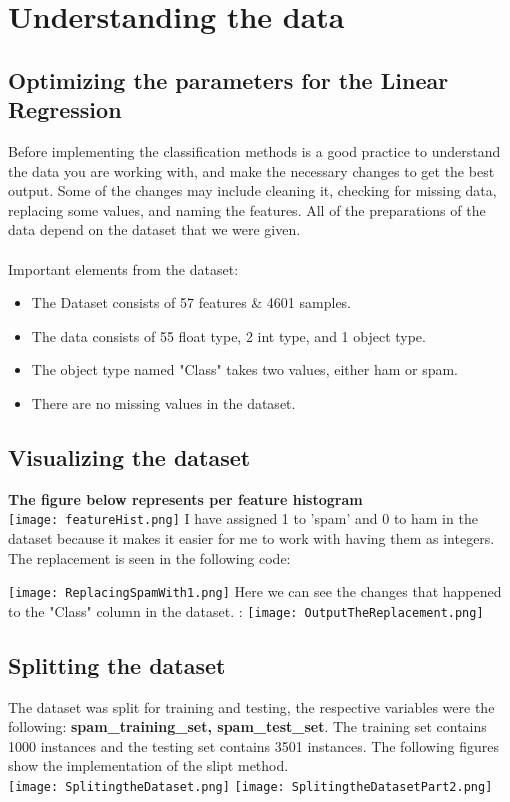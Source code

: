 \documentclass{article}
\begin{document}
\section{Understanding the data}

\subsection{Optimizing the parameters for the Linear Regression}

Before implementing the classification methods is a good practice to understand the data you are working with, and make the necessary changes to get the best output. Some of the changes may include cleaning it, checking for missing data, replacing some values, and naming the features. All of the preparations of the data depend on the dataset that we were given. \\
\\
Important elements from the dataset: 
\begin{itemize}
    \item The Dataset consists of 57 features & 4601 samples.
    \item The data consists of 55 float type, 2 int type, and 1 object type.
    \item The object type named "Class" takes two values, either ham or spam. 
    \item  There are no missing values in the dataset.
\end{itemize}

\subsection{Visualizing the dataset}

\centering
\textbf{The figure below represents per feature histogram}
\\
\centering
\texttt{[image: featureHist.png]}
\;
I have assigned 1 to 'spam' and 0 to ham in the dataset because it makes it easier for me to work with having them as integers. The replacement is seen in the following code:

\texttt{[image: ReplacingSpamWith1.png]}
\;
Here we can see the changes that happened to the "Class" column  in the dataset.
\hspace{1cm}:
\texttt{[image: OutputTheReplacement.png]}

\subsection{Splitting the dataset }
The dataset was split for training and testing, the respective variables were the following: 
\textbf{spam\_training\_set, spam\_test\_set}. The training set contains 1000 instances and the testing set contains 3501 instances. The following figures show the implementation of the slipt method. 
\\
\;
\texttt{[image: SplitingtheDataset.png]}
\;
\texttt{[image: SplitingtheDatasetPart2.png]}
\end{document}
